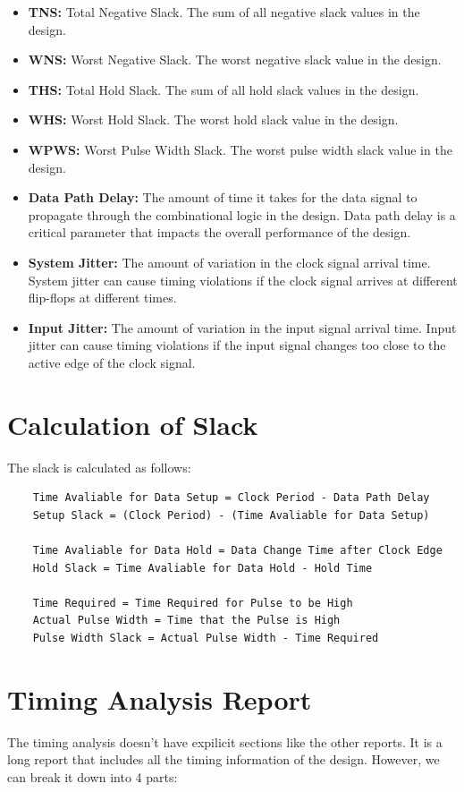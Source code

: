 \documentclass{report}
\begin{document}
\begin{itemize}
    \item \textbf{TNS: } Total Negative Slack. The sum of all negative slack values in the design.
    \item \textbf{WNS: } Worst Negative Slack. The worst negative slack value in the design.
    \item \textbf{THS: } Total Hold Slack. The sum of all hold slack values in the design.
    \item \textbf{WHS: } Worst Hold Slack. The worst hold slack value in the design.
    \item \textbf{WPWS: } Worst Pulse Width Slack. The worst pulse width slack value in the design.
    \item \textbf{Data Path Delay: } The amount of time it takes for the data signal to propagate through the combinational logic in the design. Data path delay is a critical parameter that impacts the overall performance of the design.
    \item \textbf{System Jitter: } The amount of variation in the clock signal arrival time. System jitter can cause timing violations if the clock signal arrives at different flip-flops at different times.
    \item \textbf{Input Jitter: } The amount of variation in the input signal arrival time. Input jitter can cause timing violations if the input signal changes too close to the active edge of the clock signal.
\end{itemize}
\section{Calculation of Slack}
The slack is calculated as follows:
\begin{verbatim}
    Time Avaliable for Data Setup = Clock Period - Data Path Delay
    Setup Slack = (Clock Period) - (Time Avaliable for Data Setup)

    Time Avaliable for Data Hold = Data Change Time after Clock Edge
    Hold Slack = Time Avaliable for Data Hold - Hold Time

    Time Required = Time Required for Pulse to be High 
    Actual Pulse Width = Time that the Pulse is High
    Pulse Width Slack = Actual Pulse Width - Time Required
\end{verbatim}
\section{Timing Analysis Report}
The timing analysis doesn't have expilicit sections like the other reports. It is a long report that includes all the timing information of the design. However, we can break it down into 4 parts:
\end{document}
